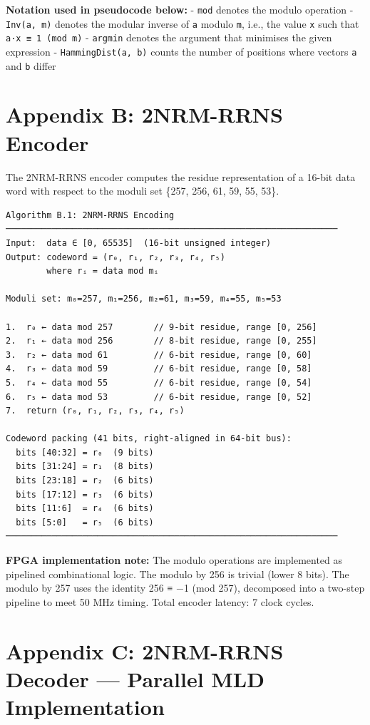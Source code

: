\documentclass[
  english,
  12pt,
]{report}
\begin{document}
\textbf{Notation used in pseudocode below:} - \texttt{mod} denotes the
modulo operation - \texttt{Inv(a,\ m)} denotes the modular inverse of
\texttt{a} modulo \texttt{m}, i.e., the value \texttt{x} such that
\texttt{a·x\ ≡\ 1\ (mod\ m)} - \texttt{argmin} denotes the argument that
minimises the given expression - \texttt{HammingDist(a,\ b)} counts the
number of positions where vectors \texttt{a} and \texttt{b} differ

\section{Appendix B: 2NRM-RRNS
Encoder}\label{appendix-b-2nrm-rrns-encoder}

The 2NRM-RRNS encoder computes the residue representation of a 16-bit
data word with respect to the moduli set \{257, 256, 61, 59, 55, 53\}.

\begin{verbatim}
Algorithm B.1: 2NRM-RRNS Encoding
─────────────────────────────────────────────────────────────────
Input:  data ∈ [0, 65535]  (16-bit unsigned integer)
Output: codeword = (r₀, r₁, r₂, r₃, r₄, r₅)
        where rᵢ = data mod mᵢ

Moduli set: m₀=257, m₁=256, m₂=61, m₃=59, m₄=55, m₅=53

1.  r₀ ← data mod 257        // 9-bit residue, range [0, 256]
2.  r₁ ← data mod 256        // 8-bit residue, range [0, 255]
3.  r₂ ← data mod 61         // 6-bit residue, range [0, 60]
4.  r₃ ← data mod 59         // 6-bit residue, range [0, 58]
5.  r₄ ← data mod 55         // 6-bit residue, range [0, 54]
6.  r₅ ← data mod 53         // 6-bit residue, range [0, 52]
7.  return (r₀, r₁, r₂, r₃, r₄, r₅)

Codeword packing (41 bits, right-aligned in 64-bit bus):
  bits [40:32] = r₀  (9 bits)
  bits [31:24] = r₁  (8 bits)
  bits [23:18] = r₂  (6 bits)
  bits [17:12] = r₃  (6 bits)
  bits [11:6]  = r₄  (6 bits)
  bits [5:0]   = r₅  (6 bits)
─────────────────────────────────────────────────────────────────
\end{verbatim}

\textbf{FPGA implementation note:} The modulo operations are implemented
as pipelined combinational logic. The modulo by 256 is trivial (lower 8
bits). The modulo by 257 uses the identity 256 ≡ −1 (mod 257),
decomposed into a two-step pipeline to meet 50 MHz timing. Total encoder
latency: 7 clock cycles.

\section{Appendix C: 2NRM-RRNS Decoder --- Parallel MLD
Implementation}\label{appendix-c-2nrm-rrns-decoder-parallel-mld-implementation}
\end{document}
